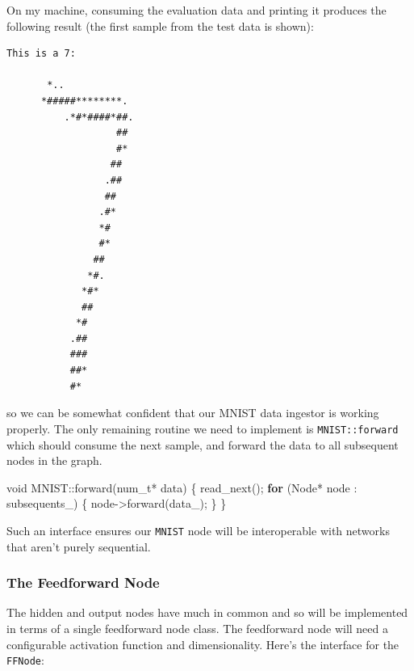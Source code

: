 \documentclass[
]{article}
\newenvironment{Shaded}{}{}
\newcommand{\ControlFlowTok}[1]{\textcolor[rgb]{0.00,0.44,0.13}{\textbf{#1}}}
\newcommand{\DataTypeTok}[1]{\textcolor[rgb]{0.56,0.13,0.00}{#1}}
\newcommand{\NormalTok}[1]{#1}
\newcommand{\VariableTok}[1]{\textcolor[rgb]{0.10,0.09,0.49}{#1}}
\begin{document}
On my machine, consuming the evaluation data and printing it produces
the following result (the first sample from the test data is shown):

\begin{verbatim}
This is a 7:
                            
       *..                  
      *#####********.       
          .*#*####*##.      
                   ##       
                   #*       
                  ##        
                 .##        
                 ##         
                .#*         
                *#          
                #*          
               ##           
              *#.           
             *#*            
             ##             
            *#              
           .##              
           ###              
           ##*              
           #*
\end{verbatim}

so we can be somewhat confident that our MNIST data ingestor is working
properly. The only remaining routine we need to implement is
\texttt{MNIST::forward} which should consume the next sample, and
forward the data to all subsequent nodes in the graph.

\begin{Shaded}
\begin{Highlighting}[]
\DataTypeTok{void}\NormalTok{ MNIST::forward(}\DataTypeTok{num\_t}\NormalTok{* data)}
\NormalTok{\{}
\NormalTok{    read\_next();}
    \ControlFlowTok{for}\NormalTok{ (Node* node : }\VariableTok{subsequents\_}\NormalTok{)}
\NormalTok{    \{}
\NormalTok{        node{-}\textgreater{}forward(}\VariableTok{data\_}\NormalTok{);}
\NormalTok{    \}}
\NormalTok{\}}
\end{Highlighting}
\end{Shaded}

Such an interface ensures our \texttt{MNIST} node will be interoperable
with networks that aren't purely sequential.

\hypertarget{the-feedforward-node}{%
\subsubsection{The Feedforward Node}\label{the-feedforward-node}}

The hidden and output nodes have much in common and so will be
implemented in terms of a single feedforward node class. The feedforward
node will need a configurable activation function and dimensionality.
Here's the interface for the \texttt{FFNode}:
\end{document}
